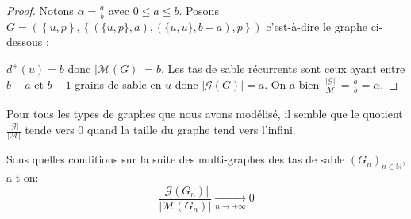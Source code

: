 \begin{proof}
Notons $\alpha = \frac{a}{b}$ avec $0 \leqslant a \leqslant b$.
Posons $G = \left(\left\{u, p\right\}, \left\{ (\{u, p\}, a), (\{u, u\}, b - a),
p \right\} \right)$ c'est-à-dire le graphe ci-dessous :
\begin{center}
\end{center}
$d^+(u) = b$ donc $\left|\mathcal{M}(G)\right| = b$.
Les tas de sable récurrents sont ceux ayant entre $b-a$ et $b-1$ grains de sable
en $u$ donc $\left|\mathcal{G}(G)\right| = a$.
On a bien $\displaystyle \frac{\left|\mathcal{G}\right|}
{\left|\mathcal{M}\right|} = \frac{a}{b} = \alpha$.
\end{proof}

\begin{remarque}
Pour tous les types de graphes que nous avons modélisé, il semble que le
quotient $\displaystyle \frac{\left|\mathcal{G}\right|}
{\left|\mathcal{M}\right|}$ tende vers 0
quand la taille du graphe tend vers l'infini.
\end{remarque}

\begin{question}
Sous quelles conditions sur la suite des multi-graphes des tas de sable
$\left(G_n\right)_{n \in \mathbb{N}}$, a-t-on:
$$
\frac{\left|\mathcal{G}\left(G_n\right)\right|}
{\left|\mathcal{M}\left(G_n\right)\right|}
\underset{n \rightarrow +\infty}{\longrightarrow} 0
$$
\end{question}